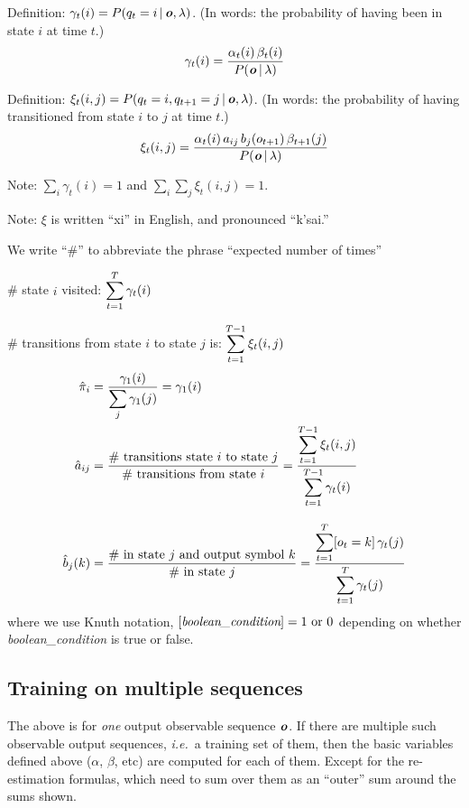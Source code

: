 Definition: $\gamma_t(i) = P(q_t=i \operatorname*{\vert} \boldsymbol{\mathit{o}}, \lambda)$.  (In
words: the probability of having been in state $i$ at time $t$.)
\begin{equation}
  \gamma_t(i) =
  \frac{\alpha_t(i) \, \beta_t(i)}{P(\boldsymbol{\mathit{o}} \operatorname*{\vert} \lambda)}
\end{equation}

Definition: $\xi_t(i,j) = P(q_t=i, q_{t+1}=j \operatorname*{\vert} \boldsymbol{\mathit{o}}, \lambda)$.
(In words: the probability of having transitioned from state $i$ to
$j$ at time $t$.)
\begin{equation}
  \xi_t(i,j) =
  \frac
  {\alpha_t(i) \, a_{ij} \, b_j(o_{t+1}) \, \beta_{t+1}(j)}
  {P(\boldsymbol{\mathit{o}} \operatorname*{\vert} \lambda)}
\end{equation}

Note: $\sum_i \gamma_t(i) = 1$ and $\sum_i \sum_j \xi_t(i,j) = 1$.

Note: $\xi$ is written ``xi'' in English, and pronounced ``k'sai.''

We write ``\#'' to abbreviate the phrase ``expected number of times''

\# state $i$ visited: $\displaystyle\sum_{t=1}^T \gamma_t(i)$

\# transitions from state $i$ to state $j$ is:
$\displaystyle\sum_{t=1}^{T-1} \xi_t(i,j)$
\begin{subequations}
\begin{align}
  \hat{\pi}_i &= \frac{\gamma_1(i)}{\displaystyle\sum_j \gamma_1(j)} = \gamma_1(i)
  \\
  \hat{a}_{ij} &= \frac{\text{\# transitions state $i$ to state
  $j$}}{\text{\# transitions from state $i$}}
  = \frac{\displaystyle\sum_{t=1}^{T-1}  \xi_t(i,j)}{\displaystyle\sum_{t=1}^{T-1} \gamma_t(i)}
  \\[2ex]
  \hat{b}_j(k)
  &= \frac{\text{\# in state $j$ and output symbol $k$}}{\text{\# in state $j$}}
  = \frac{\displaystyle\sum_{t=1}^T [o_t=k] \, \gamma_t(j)}
	 {\displaystyle\sum_{t=1}^T \gamma_t(j)}
\end{align}
\end{subequations}
where we use Knuth notation, $[\emph{boolean\_condition}] = \text{1 or
0}$ depending on whether \emph{boolean\_condition} is true or false.

\subsection{Training on multiple sequences}

The above is for \emph{one} output observable sequence $\boldsymbol{\mathit{o}}$.  If
there are multiple such observable output sequences, \emph{i.e.}\ a
training set of them, then the basic variables defined above
($\alpha$, $\beta$, etc) are computed for each of them.  Except for
the re-estimation formulas, which need to sum over them as an
``outer'' sum around the sums shown.

